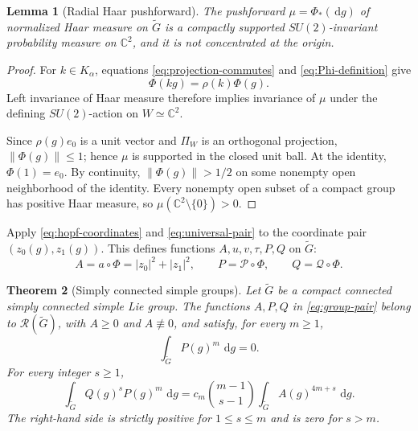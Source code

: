 \documentclass[11pt]{article}
\numberwithin{equation}{section}
\newtheorem{theorem}{Theorem}[section]
\newtheorem{lemma}[theorem]{Lemma}
\newcommand{\C}{\mathbb C}
\newcommand{\cR}{\mathcal R}
\newcommand{\dd}{\,\mathrm d}
\begin{document}
\begin{lemma}[Radial Haar pushforward]\label{lem:radial-pushforward}
The pushforward $\mu=\Phi_*(\dd g)$ of normalized Haar measure on
$\widetilde G$ is a compactly supported $SU(2)$-invariant probability measure
on $\C^2$, and it is not concentrated at the origin.
\end{lemma}

\begin{proof}
For $k\in K_\alpha$, equations \eqref{eq:projection-commutes} and
\eqref{eq:Phi-definition} give
\begin{equation}\label{eq:Phi-equivariance}
 \Phi(kg)=\rho(k)\Phi(g).
\end{equation}
Left invariance of Haar measure therefore implies invariance of $\mu$ under
the defining $SU(2)$-action on $W\simeq\C^2$.

Since $\rho(g)e_0$ is a unit vector and $\Pi_W$ is an orthogonal projection,
$\|\Phi(g)\|\leq1$; hence $\mu$ is supported in the closed unit ball.  At the
identity, $\Phi(1)=e_0$.  By continuity, $\|\Phi(g)\|>1/2$ on some nonempty
open neighborhood of the identity.  Every nonempty open subset of a compact
group has positive Haar measure, so $\mu(\C^2\setminus\{0\})>0$.
\end{proof}

Apply \eqref{eq:hopf-coordinates} and \eqref{eq:universal-pair} to the
coordinate pair $(z_0(g),z_1(g))$.  This defines functions
$A,u,v,\tau,P,Q$ on $\widetilde G$:
\begin{equation}\label{eq:group-pair}
 A=a\circ\Phi=|z_0|^2+|z_1|^2,
 \qquad
 P=\mathscr P\circ\Phi,
 \qquad
 Q=\mathscr Q\circ\Phi.
\end{equation}

\begin{theorem}[Simply connected simple groups]\label{thm:simply-connected-simple}
Let $\widetilde G$ be a compact connected simply connected simple Lie group.
The functions $A,P,Q$ in \eqref{eq:group-pair} belong to $\cR(\widetilde G)$,
with $A\geq0$ and $A\not\equiv0$, and satisfy, for every $m\geq1$,
\begin{equation}\label{eq:simple-pure}
 \int_{\widetilde G}P(g)^m\,\dd g=0.
\end{equation}
For every integer $s\geq1$,
\begin{equation}\label{eq:simple-marker-tower}
 \int_{\widetilde G}Q(g)^sP(g)^m\,\dd g
 =c_m\binom{m-1}{s-1}
 \int_{\widetilde G}A(g)^{4m+s}\,\dd g.
\end{equation}
The right-hand side is strictly positive for $1\leq s\leq m$ and is zero for
$s>m$.
\end{theorem}
\end{document}
